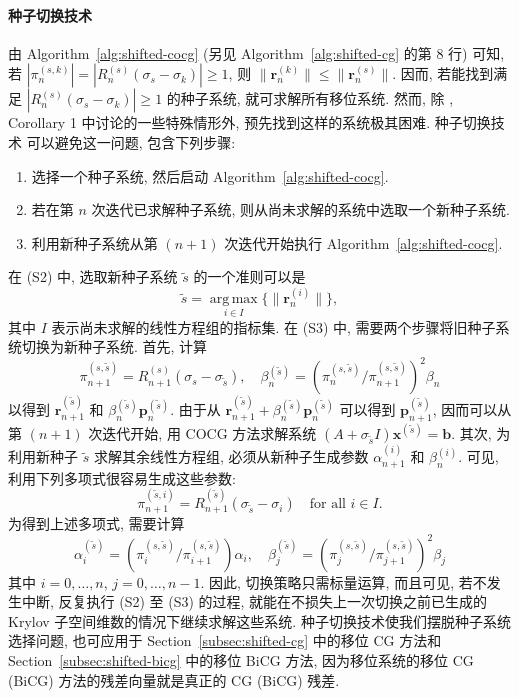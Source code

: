 \paragraph{{种子切换技术}}\label{subsubsec:seed-switching}\mbox{}\par
{由 Algorithm\ \ref{alg:shifted-cocg} (另见 Algorithm\ \ref{alg:shifted-cg} 的第 8 行) 可知, 若 $|\pi_n^{(s,k)}|=|R_n^{(s)}(\sigma_s-\sigma_k)|\ge1$, 则 $\|\bm r_n^{(k)}\|\le\|\bm r_n^{(s)}\|$. 因而, 若能找到满足 $|R_n^{(s)}(\sigma_s-\sigma_k)|\ge1$ 的种子系统, 就可求解所有移位系统. 然而, 除 , Corollary 1 中讨论的一些特殊情形外, 预先找到这样的系统极其困难. 种子切换技术  可以避免这一问题, 包含下列步骤:}
\begin{enumerate}[label=(S\arabic*)]
\item {选择一个种子系统, 然后启动 Algorithm\ \ref{alg:shifted-cocg}.}
\item {若在第 $n$ 次迭代已求解种子系统, 则从尚未求解的系统中选取一个新种子系统.}
\item {利用新种子系统从第 $(n+1)$ 次迭代开始执行 Algorithm\ \ref{alg:shifted-cocg}.}
\end{enumerate}
{在 (S2) 中, 选取新种子系统 $\widetilde s$ 的一个准则可以是}
\[\widetilde s=\operatorname*{arg\,max}_{i\in I}\{\|\bm r_n^{(i)}\|\},\]
{其中 $I$ 表示尚未求解的线性方程组的指标集. 在 (S3) 中, 需要两个步骤将旧种子系统切换为新种子系统. 首先, 计算}
\[\pi_{n+1}^{(s,\widetilde s)}=R_{n+1}^{(s)}(\sigma_s-\sigma_{\widetilde s}),\quad\beta_n^{(\widetilde s)}=\left(\pi_n^{(s,\widetilde s)}/\pi_{n+1}^{(s,\widetilde s)}\right)^2\beta_n\]
{以得到 $\bm r_{n+1}^{(\widetilde s)}$ 和 $\beta_n^{(\widetilde s)}\bm p_n^{(\widetilde s)}$. 由于从 $\bm r_{n+1}^{(\widetilde s)}+\beta_n^{(\widetilde s)}\bm p_n^{(\widetilde s)}$ 可以得到 $\bm p_{n+1}^{(\widetilde s)}$, 因而可以从第 $(n+1)$ 次迭代开始, 用 COCG 方法求解系统 $(A+\sigma_{\widetilde s}I)\bm x^{(\widetilde s)}=\bm b$. 其次, 为利用新种子 $\widetilde s$ 求解其余线性方程组, 必须从新种子生成参数 $\alpha_{n+1}^{(i)}$ 和 $\beta_n^{(i)}$. 可见, 利用下列多项式很容易生成这些参数:}
\[\pi_{n+1}^{(\widetilde s,i)}=R_{n+1}^{(\widetilde s)}(\sigma_{\widetilde s}-\sigma_i)\quad\text{for all }i\in I.\]
{为得到上述多项式, 需要计算}
\[\alpha_i^{(\widetilde s)}=\left(\pi_i^{(s,\widetilde s)}/\pi_{i+1}^{(s,\widetilde s)}\right)\alpha_i,\quad\beta_j^{(\widetilde s)}=\left(\pi_j^{(s,\widetilde s)}/\pi_{j+1}^{(s,\widetilde s)}\right)^2\beta_j\]
{其中 $i=0,\ldots,n$, $j=0,\ldots,n-1$. 因此, 切换策略只需标量运算, 而且可见, 若不发生中断, 反复执行 (S2) 至 (S3) 的过程, 就能在不损失上一次切换之前已生成的 Krylov 子空间维数的情况下继续求解这些系统. 种子切换技术使我们摆脱种子系统选择问题, 也可应用于 Section\ \ref{subsec:shifted-cg} 中的移位 CG 方法和 Section\ \ref{subsec:shifted-bicg} 中的移位 BiCG 方法, 因为移位系统的移位 CG (BiCG) 方法的残差向量就是真正的 CG (BiCG) 残差.}

